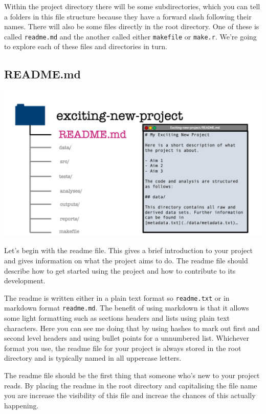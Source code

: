 \documentclass[
  12pt,
]{book}
\begin{document}
Within the project directory there will be some subdirectories, which you can tell a folders in this file structure because they have a forward slash following their names. There will also be some files directly in the root directory. One of these is called \texttt{readme.md} and the another called either \texttt{makefile} or \texttt{make.r}. We're going to explore each of these files and directories in turn.

\hypertarget{readme.md}{%
\subsection{README.md}\label{readme.md}}

\includegraphics[width=0.8\linewidth]{images/101-workflows-organising-your-work/directory-structure-drawings/directory-structure-drawing-5}

Let's begin with the readme file. This gives a brief introduction to your project and gives information on what the project aims to do. The readme file should describe how to get started using the project and how to contribute to its development.

The readme is written either in a plain text format so \texttt{readme.txt} or in markdown
format \texttt{readme.md}. The benefit of using markdown is that it allows some light
formatting such as sections headers and lists using plain text characters.
Here you can see me doing that by using hashes to mark out first and second level headers and using bullet points for a unnumbered list. Whichever format you use, the readme file for your project is always stored in the root directory and is typically named in all uppercase letters.

The readme file should be the first thing that someone who's new to your project reads. By placing the readme in the root directory and capitalising the file name you are increase the visibility of this file and increae the chances of this actually happening.
\end{document}
